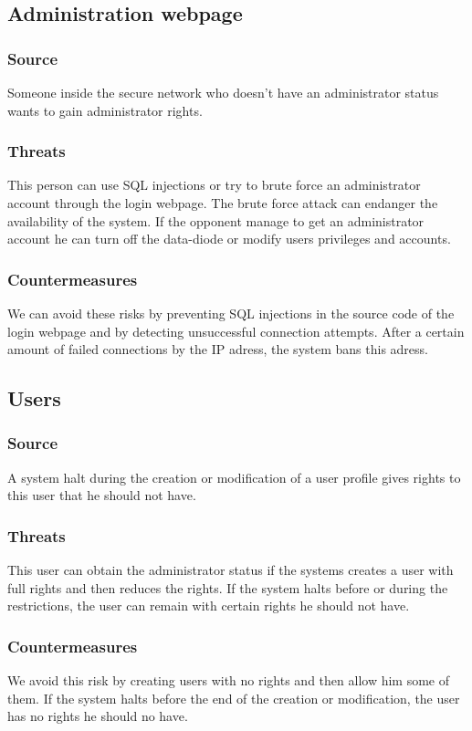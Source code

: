 \documentclass[a4paper,11pt]{article}
\begin{document}
\subsection{Administration webpage}
\subsubsection{Source}
Someone inside the secure network who doesn't have an administrator status wants to gain administrator rights.

\subsubsection{Threats}
This person can use SQL injections or try to brute force an administrator account through the login webpage. The brute force attack can endanger the availability of the system. If the opponent manage to get an administrator account he can turn off the data-diode or modify users privileges and accounts.
\subsubsection{Countermeasures}
We can avoid these risks by preventing SQL injections in the source code of the login webpage and by detecting unsuccessful connection attempts. After a certain amount of failed connections by the IP adress, the system bans this adress.
\subsection{Users}
\subsubsection{Source}
A system halt during the creation or modification of a user profile gives rights to this user that he should not have.
\subsubsection{Threats}
This user can obtain the administrator status if the systems creates a user with full rights and then reduces the rights. If the system halts before or during the restrictions, the user can remain with certain rights he should not have.
\subsubsection{Countermeasures}
We avoid this risk by creating users with no rights and then allow him some of them. If the system halts before the end of the creation or modification, the user has no rights he should no have.  
\end{document}
